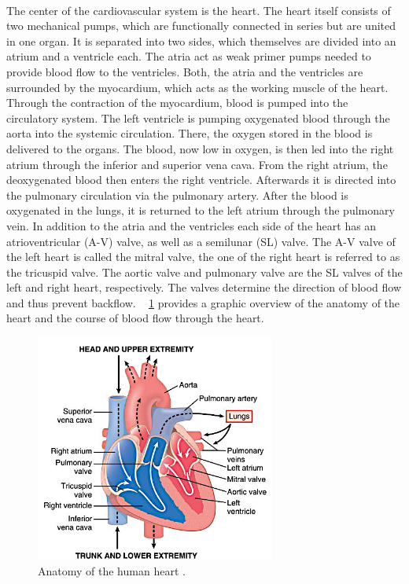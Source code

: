  \\The center of the cardiovascular system is the heart. The heart itself consists of two mechanical pumps, which are functionally connected in series but are united in one organ. It is separated into two sides, which themselves are divided into an atrium and a ventricle each. The atria act as weak primer pumps needed to provide blood flow to the ventricles. \cite{HKS4} Both, the atria and the ventricles are surrounded by the myocardium, which acts as the working muscle of the heart. Through the contraction of the myocardium, blood is pumped into the circulatory system. \cite{HKS7} The left ventricle is pumping oxygenated blood through the aorta into the systemic circulation. There, the oxygen stored in the blood is delivered to the organs. The blood, now low in oxygen, is then led into the right atrium through the inferior and superior vena cava. From the right atrium, the deoxygenated blood then enters the right ventricle. Afterwards it is directed into the pulmonary circulation via the pulmonary artery. After the blood is oxygenated in the lungs, it is returned to the left atrium through the pulmonary vein. \cite{HKS4} In addition to the atria and the ventricles each side of the heart has an atrioventricular (A-V) valve, as well as a semilunar (SL) valve. The A-V valve of the left heart is called the mitral valve, the one of the right heart is referred to as the tricuspid valve. The aortic valve and pulmonary valve are the SL valves of the left and right heart, respectively. The valves determine the direction of blood flow and thus prevent backflow. \cite{HKS7} \figurename~ \ref{fig:heart_anat} provides a graphic overview of the anatomy of the heart and the course of blood flow through the heart.
 \begin{figure}[h]
   \centering
   \includegraphics[width=0.7\textwidth]{images/heart_1.jpg}
   \caption[Anatomy of the human heart]{Anatomy of the human heart \cite{GH20}.}
   \label{fig:heart_anat}
 \end{figure}

